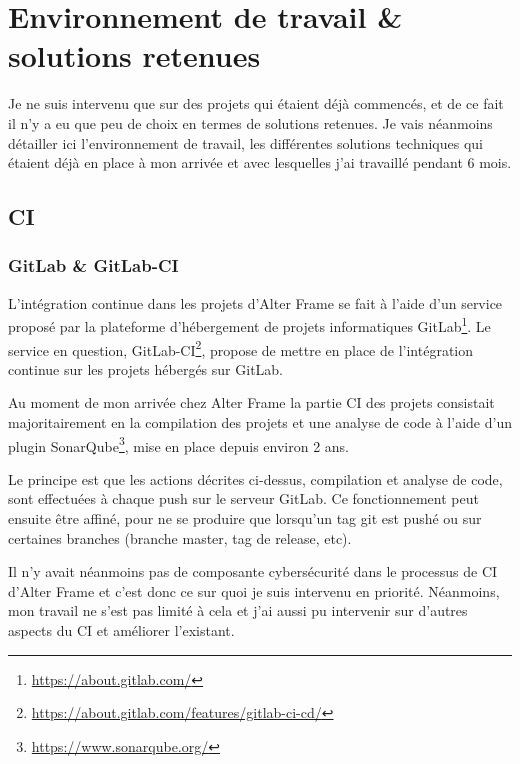 \section{Environnement de travail \& solutions retenues}
Je ne suis intervenu que sur des projets qui étaient déjà commencés, et de ce fait il n'y a eu que peu de choix en termes de solutions retenues. Je vais néanmoins détailler ici l'environnement de travail, les différentes solutions techniques qui étaient déjà en place à mon arrivée et avec lesquelles j'ai travaillé pendant 6 mois. 

\subsection{CI}
\subsubsection{GitLab \& GitLab-CI}
L'intégration continue dans les projets d'Alter Frame se fait à l'aide d'un service proposé par la plateforme d'hébergement de projets informatiques GitLab\footnote{\url{https://about.gitlab.com/}}. Le service en question, GitLab-CI\footnote{\url{https://about.gitlab.com/features/gitlab-ci-cd/}}, propose de mettre en place de l'intégration continue sur les projets hébergés sur GitLab.

Au moment de mon arrivée chez Alter Frame la partie CI des projets consistait majoritairement en la compilation des projets et une analyse de code à l'aide d'un plugin SonarQube\footnote{\url{https://www.sonarqube.org/}}, mise en place depuis environ 2 ans.

Le principe est que les actions décrites ci-dessus, compilation et analyse de code, sont effectuées à chaque push sur le serveur GitLab. Ce fonctionnement peut ensuite être affiné, pour ne se produire que lorsqu'un tag git est pushé ou sur certaines branches (branche master, tag de release, etc).

Il n'y avait néanmoins pas de composante cybersécurité dans le processus de CI d'Alter Frame et c'est donc ce sur quoi je suis intervenu en priorité. Néanmoins, mon travail ne s'est pas limité à cela et j'ai aussi pu intervenir sur d'autres aspects du CI et améliorer l'existant.

